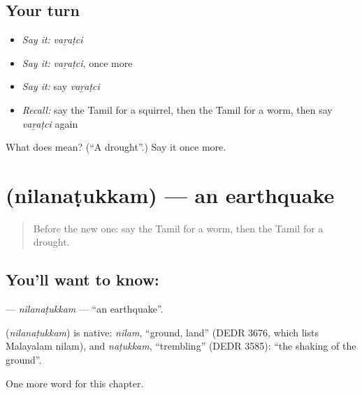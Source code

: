 \subsection*{Your turn}
\begin{itemize}
\raggedright
  \item \emph{Say it:} \emph{vaṟaṭci}
  \item \emph{Say it:} \emph{vaṟaṭci}, once more
  \item \emph{Say it:} say \emph{vaṟaṭci}
  \item \emph{Recall:} say the Tamil for a squirrel, then the Tamil for a worm, then say \emph{vaṟaṭci} again
\end{itemize}

\begin{tcolorbox}[breakable,colback=teal!4,colframe=teal!35!black,title={Before you move on}]
What does  mean? (\textquotedblleft{}A drought\textquotedblright{}.) Say it once more.
\end{tcolorbox}
\section[\texorpdfstring{\ta{நிலநடுக்கம்} (nilanaṭukkam)}{நிலநடுக்கம் (nilanaṭukkam)}]{ (nilanaṭukkam) — an earthquake}

\label{lesson:TA-C248-nilanatukkam}



\begin{quote}
Before the new one: say the Tamil for a worm, then the Tamil for a drought.
\end{quote}

\subsection*{You'll want to know: }
\textbf{} — \emph{nilanaṭukkam} — \textquotedblleft{}an earthquake\textquotedblright{}.

\begin{cousinweb}
\textbf{} (\emph{nilanaṭukkam}) is native: \emph{nilam}, \textquotedblleft{}ground, land\textquotedblright{} (DEDR 3676, which lists Malayalam nilam), and \emph{naṭukkam}, \textquotedblleft{}trembling\textquotedblright{} (DEDR 3585): \textquotedblleft{}the shaking of the ground\textquotedblright{}.
\end{cousinweb}

\begin{grammarlens}[title={What you've built}]
One more word for this chapter.
\end{grammarlens}


